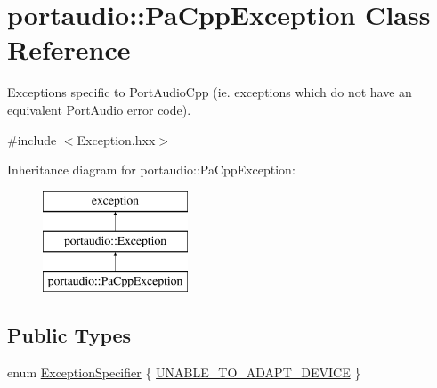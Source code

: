 \hypertarget{classportaudio_1_1_pa_cpp_exception}{}\section{portaudio\+:\+:Pa\+Cpp\+Exception Class Reference}
\label{classportaudio_1_1_pa_cpp_exception}


Exceptions specific to Port\+Audio\+Cpp (ie. exceptions which do not have an equivalent Port\+Audio error code).  




{\ttfamily \#include $<$Exception.\+hxx$>$}

Inheritance diagram for portaudio\+:\+:Pa\+Cpp\+Exception\+:\begin{figure}[H]
\begin{center}
\leavevmode
\includegraphics[height=3.000000cm]{classportaudio_1_1_pa_cpp_exception}
\end{center}
\end{figure}
\subsection*{Public Types}
\begin{DoxyCompactItemize}
\item 
enum \hyperlink{classportaudio_1_1_pa_cpp_exception_aa6c1263b3c7addf88222904aff9bdbfa}{Exception\+Specifier} \{ \hyperlink{classportaudio_1_1_pa_cpp_exception_aa6c1263b3c7addf88222904aff9bdbfaa6ce04f8dd846a25a86e297466a9f14cf}{U\+N\+A\+B\+L\+E\+\_\+\+T\+O\+\_\+\+A\+D\+A\+P\+T\+\_\+\+D\+E\+V\+I\+CE}
 \}
\end{DoxyCompactItemize}
